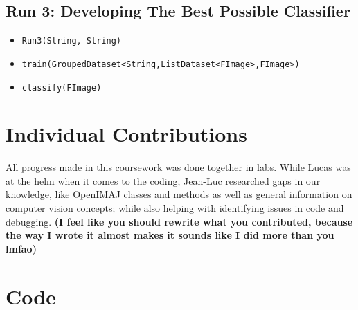 \documentclass[a4paper,12pt]{article}
\begin{document}
\subsection{Run 3: Developing The Best Possible Classifier}
\begin{itemize}
	\item \texttt{Run3(String, String)}
	\item \texttt{train(GroupedDataset<String,ListDataset<FImage>,FImage>)}
	\item \texttt{classify(FImage)}
\end{itemize}

\section{Individual Contributions}
All progress made in this coursework was done together in labs. While Lucas was at the helm when it comes to the coding, Jean-Luc researched gaps in our knowledge, like OpenIMAJ classes and methods as well as general information on computer vision concepts; while also helping with identifying issues in code and debugging.
\textbf{(I feel like you should rewrite what you contributed, because the way I wrote it almost makes it sounds like I did more than you lmfao)}
\appendix
\section{Code}
\end{document}
